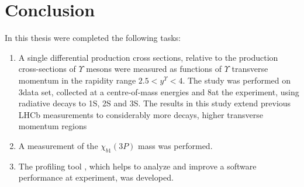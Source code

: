 \chapter{Conclusion}

In this thesis were completed the following tasks:

\begin{enumerate}

\item  A single differential \chib production cross sections,
relative to the production  cross-sections of $\Upsilon$ mesons were measured
as functions of $\Upsilon$ transverse momentum in the rapidity range $2.5 <
y^{\Upsilon} < 4$. The study  was performed on 3\invfb data set, collected at a
centre-of-mass energies  and 8\tev at the \lhcb experiment, using \chib
radiative decays to \Y1S, \Y2S and \Y3S. The results in this study extend
previous LHCb measurements to considerably more decays, higher transverse
momentum regions

\item A measurement of the $\chi_{b1}(3P)$ mass was  performed.

\item The profiling tool , which helps to analyze and improve a
software performance at \lhcb experiment, was developed.

\end{enumerate}

